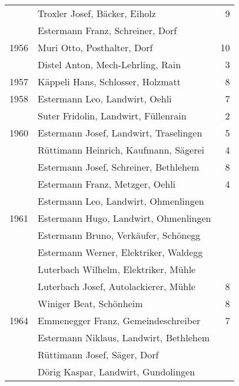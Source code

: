 {\begin{longtable}{ l l r }
                      & Troxler Josef, Bäcker, Eiholz             & 9           \\
                      & Estermann Franz, Schreiner, Dorf          &             \\
        1956          & Muri Otto, Posthalter, Dorf               & 10          \\
                      & Distel Anton, Mech-Lehrling, Rain         & 3           \\
        1957          & Käppeli Hans, Schlosser, Holzmatt         & 8           \\
        1958          & Estermann Leo, Landwirt, Oehli            & 7           \\
                      & Suter Fridolin, Landwirt, Füllenrain      & 2           \\
        1960          & Estermann Josef, Landwirt, Traselingen    & 5           \\
                      & Rüttimann Heinrich, Kaufmann, Sägerei     & 4           \\
                      & Estermann Josef, Schreiner, Bethlehem     & 8           \\
                      & Estermann Franz, Metzger, Oehli           & 4           \\
                      & Estermann Leo, Landwirt, Ohmenlingen      &             \\
        1961          & Estermann Hugo, Landwirt, Ohmenlingen     &             \\
                      & Estermann Bruno, Verkäufer, Schönegg      &             \\
                      & Estermann Werner, Elektriker, Waldegg     &             \\
                      & Luterbach Wilhelm, Elektriker, Mühle      &             \\
                      & Luterbach Josef, Autolackierer, Mühle     & 8           \\
                      & Winiger Beat, Schönheim                   & 8           \\
        1964          & Emmenegger Franz, Gemeindeschreiber       & 7           \\
                      & Estermann Niklaus, Landwirt, Bethlehem    &             \\
                      & Rüttimann Josef, Säger, Dorf              &             \\
                      & Dörig Kaspar, Landwirt, Gundolingen       &             \\

\end{longtable}}
